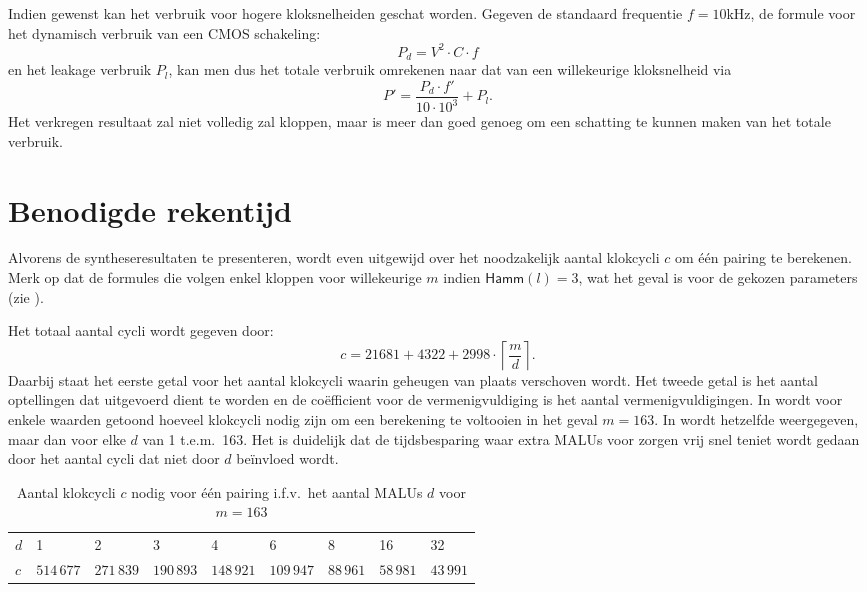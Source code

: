 
Indien gewenst kan het verbruik voor hogere kloksnelheiden geschat worden. Gegeven de standaard frequentie $f = 10$kHz, de formule voor het dynamisch verbruik van een CMOS schakeling:
\[P_d = V^2 \cdot C \cdot f\]
en het leakage verbruik $P_l$, kan men dus het totale verbruik omrekenen naar dat van een willekeurige kloksnelheid via
\[P' = \frac{P_d \cdot f'}{10 \cdot 10^3} + P_l.\]
Het verkregen resultaat zal niet volledig zal kloppen, maar is meer dan goed genoeg om een schatting te kunnen maken van het totale verbruik.

\section{Benodigde rekentijd}

Alvorens de syntheseresultaten te presenteren, wordt even uitgewijd over het noodzakelijk aantal klokcycli $c$ om \'e\'en pairing te berekenen. Merk op dat de formules die volgen enkel kloppen voor willekeurige $m$ indien $\textsf{Hamm}(l) = 3$, wat het geval is voor de gekozen parameters (zie ).

Het totaal aantal cycli wordt gegeven door:
\[c = 21681 + 4322 + 2998 \cdot \left\lceil \frac{m}{d} \right\rceil.\]
Daarbij staat het eerste getal voor het aantal klokcycli waarin geheugen van plaats verschoven wordt. Het tweede getal is het aantal optellingen dat uitgevoerd dient te worden en de co\"efficient voor de vermenigvuldiging is het aantal vermenigvuldigingen. In  wordt voor enkele waarden getoond hoeveel klokcycli nodig zijn om een berekening te voltooien in het geval $m = 163$. In  wordt hetzelfde weergegeven, maar dan voor elke $d$ van 1 t.e.m.\ 163. Het is duidelijk dat de tijdsbesparing waar extra MALUs voor zorgen vrij snel teniet wordt gedaan door het aantal cycli dat niet door $d$ be\"invloed wordt.

\begin{table}[h]
	\caption{Aantal klokcycli $c$ nodig voor \'e\'en pairing i.f.v.\ het aantal MALUs $d$ voor $m = 163$}
	\label{tabel-resultaten-multi-cycles}

	\begin{narrow}{-1cm}{-1cm}
		\centering
		\begin{tabular}{lllllllll}
			\toprule
			$d$	& 1	& 2	& 3	& 4	& 6	& 8	& 16	& 32\\
			$c$	& $514\,677$	& $271\,839$	& $190\,893$	& $148\,921$	& $109\,947$	& $88\,961$	& $58\,981$	& $43\,991$\\
			\bottomrule	
		\end{tabular}
	\end{narrow}
\end{table}

